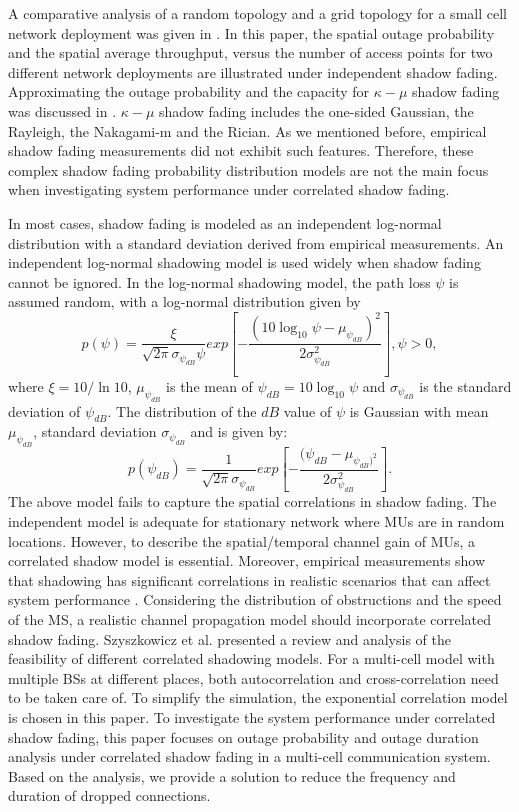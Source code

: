 \documentclass[journal,10pt]{IEEEtran}
\begin{document}
\par A comparative analysis of a random topology and a grid topology for a small cell network deployment was given in \cite{chen2012small}. In this paper, the spatial outage probability and the spatial average throughput, versus the number of access points for two different network deployments are illustrated under independent shadow fading. Approximating the outage probability and the capacity for $\kappa-\mu$ shadow fading was discussed in \cite{kumar2015approximate}. $\kappa-\mu$ shadow fading includes the one-sided Gaussian, the Rayleigh, the Nakagami-m and the Rician. As we mentioned before, empirical shadow fading measurements did not exhibit such features. Therefore, these complex shadow fading probability distribution models are not the main focus when investigating system performance under correlated shadow fading.
\par In most cases, shadow fading is modeled as an independent log-normal distribution \cite{goldsmith2005wireless} with a standard deviation derived from empirical measurements. An independent log-normal shadowing model is used widely when shadow fading cannot be ignored. In the log-normal shadowing model, the path loss $\psi$ is assumed random, with a log-normal distribution given by
\begin{equation}
p(\psi)=\frac{\xi}{\sqrt{2\pi}\sigma_{\psi_{dB}}\psi}exp[-\frac{(10\log_{10}\psi-\mu_{\psi_{dB}})^{2}}{2\sigma_{\psi_{dB}}^{2}}], \psi>0,
\end{equation}
where $\xi=10/\ln10$, $\mu_{\psi_{dB}}$ is the mean of $\psi_{dB}=10\log_{10}\psi$ and $\sigma_{\psi_{dB}}$ is the standard deviation of $\psi_{dB}$.
The distribution of the $dB$ value of $\psi$ is Gaussian with mean $\mu_{\psi_{dB}}$, standard deviation $\sigma_{\psi_{dB}}$ and is given by:
\begin{equation}
p(\psi_{dB})=\frac{1}{\sqrt{2\pi}\sigma_{\psi_{dB}}}exp[-\frac{(\psi_{dB}-\mu_{\psi_{dB})^2}}{2\sigma_{\psi_{dB}}^2}].
\end{equation}
The above model fails to capture the spatial correlations in shadow fading. The independent model is adequate for stationary network where MUs are in random locations. However, to describe the spatial/temporal channel gain of MUs, a correlated shadow model is essential. Moreover, empirical measurements show that shadowing has significant correlations in realistic scenarios that can affect system performance \cite{graziano1978propagation}. Considering the distribution of obstructions and the speed of the MS, a realistic channel propagation model should incorporate correlated shadow fading.  Szyszkowicz et al. \cite{szyszkowicz2010feasibility} presented a review and analysis of the feasibility of different correlated shadowing models. For a multi-cell model with multiple BSs at different places, both autocorrelation and cross-correlation need to be taken care of. To simplify the simulation, the exponential correlation model is chosen in this paper. To investigate the system performance under correlated shadow fading, this paper focuses on outage probability and outage duration analysis under correlated shadow fading in a multi-cell communication system. Based on the analysis, we provide a solution to reduce the frequency and duration of dropped connections.
\end{document}
